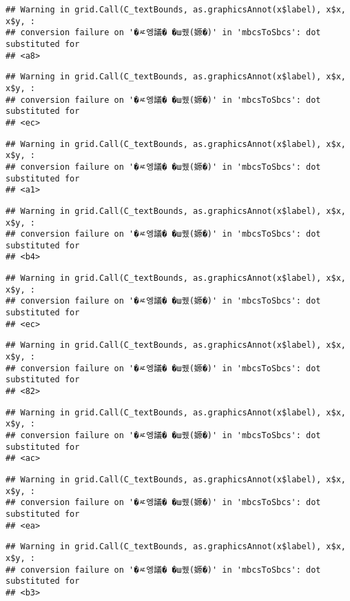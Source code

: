 \documentclass[
]{article}
\begin{document}
\begin{verbatim}
## Warning in grid.Call(C_textBounds, as.graphicsAnnot(x$label), x$x, x$y, :
## conversion failure on '�ㅼ엥議� �ш퀬(嫄�)' in 'mbcsToSbcs': dot substituted for
## <a8>
\end{verbatim}

\begin{verbatim}
## Warning in grid.Call(C_textBounds, as.graphicsAnnot(x$label), x$x, x$y, :
## conversion failure on '�ㅼ엥議� �ш퀬(嫄�)' in 'mbcsToSbcs': dot substituted for
## <ec>
\end{verbatim}

\begin{verbatim}
## Warning in grid.Call(C_textBounds, as.graphicsAnnot(x$label), x$x, x$y, :
## conversion failure on '�ㅼ엥議� �ш퀬(嫄�)' in 'mbcsToSbcs': dot substituted for
## <a1>
\end{verbatim}

\begin{verbatim}
## Warning in grid.Call(C_textBounds, as.graphicsAnnot(x$label), x$x, x$y, :
## conversion failure on '�ㅼ엥議� �ш퀬(嫄�)' in 'mbcsToSbcs': dot substituted for
## <b4>
\end{verbatim}

\begin{verbatim}
## Warning in grid.Call(C_textBounds, as.graphicsAnnot(x$label), x$x, x$y, :
## conversion failure on '�ㅼ엥議� �ш퀬(嫄�)' in 'mbcsToSbcs': dot substituted for
## <ec>
\end{verbatim}

\begin{verbatim}
## Warning in grid.Call(C_textBounds, as.graphicsAnnot(x$label), x$x, x$y, :
## conversion failure on '�ㅼ엥議� �ш퀬(嫄�)' in 'mbcsToSbcs': dot substituted for
## <82>
\end{verbatim}

\begin{verbatim}
## Warning in grid.Call(C_textBounds, as.graphicsAnnot(x$label), x$x, x$y, :
## conversion failure on '�ㅼ엥議� �ш퀬(嫄�)' in 'mbcsToSbcs': dot substituted for
## <ac>
\end{verbatim}

\begin{verbatim}
## Warning in grid.Call(C_textBounds, as.graphicsAnnot(x$label), x$x, x$y, :
## conversion failure on '�ㅼ엥議� �ш퀬(嫄�)' in 'mbcsToSbcs': dot substituted for
## <ea>
\end{verbatim}

\begin{verbatim}
## Warning in grid.Call(C_textBounds, as.graphicsAnnot(x$label), x$x, x$y, :
## conversion failure on '�ㅼ엥議� �ш퀬(嫄�)' in 'mbcsToSbcs': dot substituted for
## <b3>
\end{verbatim}
\end{document}
